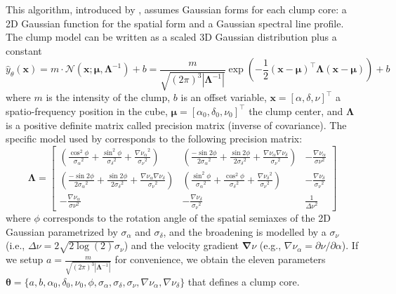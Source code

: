 \documentclass[manuscript]{aastex}
\newcommand{\vl}[1]{{\mathbf #1}}
\newcommand{\vs}[1]{{\boldsymbol #1}}
\begin{document}
This algorithm, introduced by \citep{Stutzki}, assumes Gaussian forms for 
each clump core: a 2D Gaussian function for the spatial form and a
Gaussian spectral line profile. The clump model can be written as a scaled 
3D Gaussian distribution plus a constant
\begin{equation}
\hat{y}_\theta(\vl{x})=m\cdot\mathcal{N}(\vl{x};\vs{\mu},\vs{\Lambda}^{-1}) + b
=\frac{m}{\sqrt{(2\pi)^3|\vs{\Lambda}^{-1}|}}
\exp\left(-\frac{1}{2}({\vl{x}}-{\vs{\mu}})^\top{\vs{\Lambda}}({\vl{x}}-{\vs{\mu}})\right)
+ b
\end{equation}
where $m$ is the intensity of the clump, $b$ is an offset variable, 
$\vl{x} = [ \alpha,\delta,\nu ]^\top$
a spatio-frequency position in the cube, $\vs{\mu} = [ \alpha_0,\delta_0,\nu_0
]^\top$ the 
clump center, and $\vs{\Lambda}$ is a positive definite matrix called precision
matrix (inverse of covariance). The specific model used by \citet{Stutzki} corresponds to the
following precision matrix:
\begin{equation}
\vs{\Lambda} =
\left[ \begin{array}{ccc}
\left(\frac{\cos^2\phi}{{\sigma_\alpha}^2} + \frac{\sin^2\phi}{{\sigma_\delta}^2} +
\frac{{\nabla \nu_\alpha}^2}{{\sigma_\nu}^2}\right) &
\left(\frac{-\sin2\phi}{2{\sigma_\alpha}^2} + \frac{\sin2\phi}{2{\sigma_\delta}^2} +
\frac{{\nabla \nu_\alpha} {\nabla \nu_\delta} }{{\sigma_\nu}^2}\right) & 
- \frac{{\nabla \nu_\alpha}}{{\sigma\nu}^2}  \\
\left(\frac{-\sin2\phi}{2{\sigma_\alpha}^2} +
\frac{\sin2\phi}{2{\sigma_\delta}^2} +
\frac{{\nabla \nu_\alpha} {\nabla \nu_\delta} }{{\sigma_\nu}^2}\right) & 
\left(\frac{\sin^2\phi}{{\sigma_\alpha}^2} + \frac{\cos^2\phi}{{\sigma_\delta}^2} +
\frac{{\nabla \nu_\delta}^2}{{\sigma_\nu}^2} \right) &
- \frac{{\nabla \nu_\delta}}{{\sigma_\nu}^2} \\
- \frac{{\nabla \nu_\alpha}}{{\sigma\nu}^2} &
- \frac{{\nabla \nu_\delta}}{{\sigma_\nu}^2} &
\frac{1}{{\Delta \nu}^2}
\end{array} \right]
\end{equation}
where $\phi$ corresponds to the rotation angle of the spatial semiaxes of the
2D Gaussian parametrized by $\sigma_\alpha$ and $\sigma_\delta$, and the
broadening is modelled by a $\sigma_\nu$ (i.e., $\Delta \nu=2\sqrt{2\log(2)} \sigma_\nu$)
and the velocity gradient $\vs{\nabla\nu}$ (e.g., $\nabla\nu_\alpha = \partial
\nu/\partial\alpha $). If we setup $a=\frac{m}{\sqrt{(2\pi)^3|\vs{\Lambda}^{-1}|}}$
for convenience, we obtain the eleven parameters $\vs{\theta}=
\{a,b,\alpha_0,\delta_0,\nu_0,\phi,\sigma_\alpha,\sigma_\delta, \sigma_\nu,
\nabla\nu_\alpha,\nabla\nu_\delta\}$ that defines a clump core.
\end{document}
